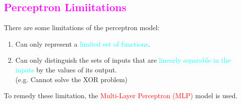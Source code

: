 \documentclass{book}
\begin{document}
\textcolor{magenta}{\section{\textbf{Perceptron Limiitations}}}
There are some limitations of the perceptron model:
\begin{enumerate}
    \item Can only represent a \textcolor{cyan}{limited set of functions}.
    \item Can only distinguish the sets of inputs that are \textcolor{cyan}{linearly separable in the inputs} by the values of its output.\\
    (e.g. Cannot solve the XOR problem)
\end{enumerate}
\vspace{3mm}
To remedy these limitation, the \textcolor{red}{Multi-Layer Perceptron (MLP)} model is used.
\end{document}
